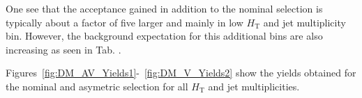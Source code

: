 One see that the acceptance gained in addition to the nominal selection is typically about a factor of five larger and mainly in low $H_\textrm{T}$ and jet multiplicity bin.
However, the background expectation for this additional bins are also increasing as seen in Tab. .

Figures~\ref{fig:DM_AV_Yields1}-~\ref{fig:DM_V_Yields2} show the yields obtained for the nominal and asymetric selection for all $H_\textrm{T}$ and jet multiplicities.

\begin{figure}[]
  \centering
  ~~
  \\


\end{figure}
